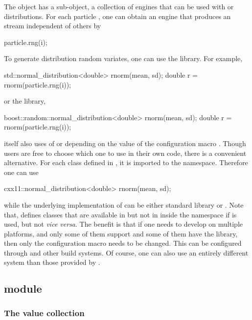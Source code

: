 \documentclass[11pt, fontset=Minion, showoverfull,
bib, mintcode, minted=cache]{marticle}
\begin{document}
The  object has a sub-object, a collection of \rng
engines that can be used with \cppoo {} or \lboost
distributions. For each particle , one can obtain an engine that
produces an \rng stream independent of others by
\begin{cppcode}
particle.rng(i);
\end{cppcode}
To generate distribution random variates, one can use the
\cppoo {} library. For example,
\begin{cppcode}
std::normal_distribution<double> rnorm(mean, sd);
double r = rnorm(particle.rng(i));
\end{cppcode}
or the \lboost library,
\begin{cppcode}
boost::random::normal_distribution<double> rnorm(mean, sd);
double r = rnorm(particle.rng(i));
\end{cppcode}
\vsmc itself also uses of \cppoo {} or \lboost depending on
the value of the configuration macro .
Though users are free to choose which one to use in their own code, there is a
convenient alternative. For each class defined in \cppoo {},
it is imported to the  namespace.  Therefore one can use
\begin{cppcode}
cxx11::normal_distribution<double> rnorm(mean, sd);
\end{cppcode}
while the underlying implementation of  can be
either \cppoo standard library or \lboost. Note that, \vsmc defines classes
that are available in \cppoo {} but not in \lboost inside
the  namespace if \lboost is used, but not \emph{vice versa}.
The benefit is that if one needs to develop on multiple platforms, and only
some of them support \cppoo and some of them have the \lboost library, then
only the configuration macro  needs to be
changed. This can be configured through \lcmake and other build systems. Of
course, one can also use an entirely different \rng system than those provided
by \vsmc.

\subsection[SMP module]{\protect\smp module}
\label{sub:SMP module}

\subsubsection{The value collection}
\end{document}
